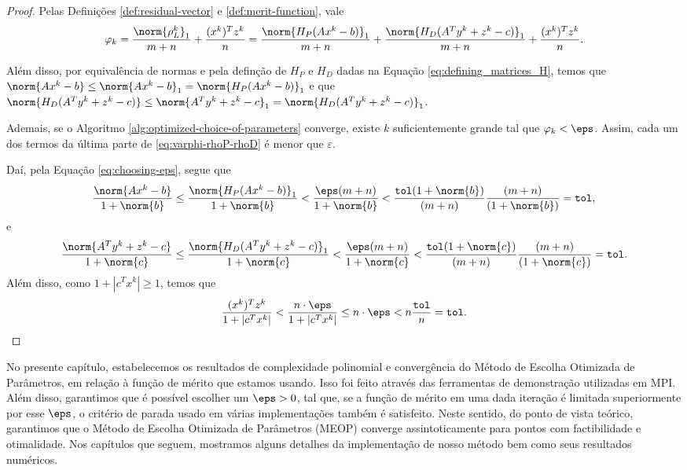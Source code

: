 \begin{proof}
	 Pelas Definições \ref{def:residual-vector} e \ref{def:merit-function}, vale
	\begin{equation}
		\label{eq:varphi-rhoP-rhoD}
				\varphi_{k} =  \frac{\norm{\rho^{k}_L}_1}{m+n} + 
\frac{(x^{k})^Tz^{k}}{n}  = \frac{\norm{H_{P}(Ax^{k} - b)}_1}{m+n} +\frac{\norm{H_{D}(A^{T}y^{k} + z^{k}- c)}_1 }{m+n} + 
\frac{(x^{k})^Tz^{k}}{n}.
	\end{equation}

Além disso, por equivalência de normas e pela definção de $H_{P}$ e $H_{D}$ dadas na Equação \eqref{eq:defining_matrices_H}, temos que $\norm{Ax^{k} - b} \leq \norm{Ax^{k} - b}_{1} = \norm{H_{P}(Ax^{k} - b)}_{1}$ e que $\norm{H_{D}(A^{T}y^{k} + z^{k}- c)} \leq \norm{A^{T}y^{k} + z^{k}- c}_1 = \norm{H_{D}(A^{T}y^{k} + z^{k}- c)}_1$.

Ademais, se  o Algoritmo \ref{alg:optimized-choice-of-parameters} converge, existe $k$ suficientemente grande tal que $\varphi_{k}<\eps$. Assim, cada um dos termos da última parte de \eqref{eq:varphi-rhoP-rhoD} é menor que $\varepsilon$.


Daí, pela Equação \eqref{eq:choosing-eps}, segue que 
\[
\dfrac{\norm{Ax^{k} - b}}{1 + \norm{b}} \leq  \frac{\norm{H_{P}(Ax^{k} - b)}_1  }{1 + \norm{b}} < \frac{\eps (m+n)}{1 + \norm{b}} <\frac{\tol(1+\norm{b})}{(m+n)} \frac{(m+n)}{(1 + \norm{b})} = \tol,
\]
e
\[
\dfrac{\norm{A^{T}y^{k} + z^{k}- c}}{1 + \norm{c}} \leq  \frac{\norm{H_{D}(A^{T}y^{k} + z^{k}- c)}_{1}  }{1 + \norm{c}} < \frac{\eps (m+n)}{1 + \norm{c}} <\frac{\tol(1+\norm{c})}{(m+n)} \frac{(m+n)}{(1 + \norm{c})} = \tol.
\]
Além disso, como $1+ |c^{T}x^{k}| \geq 1$, temos que 
\[
\dfrac{(x^{k})^{T}z^{k}}{1+ |c^{T}x^{k}|} <   \frac{n\cdot  \eps}{1+ |c^{T}x^{k}|} \leq n \cdot \eps < n \frac{\tol}{n} = \tol. \qedhere
\]
 \end{proof}

No presente capítulo, estabelecemos os resultados de complexidade polinomial e convergência  do Método de Escolha Otimizada de Parâmetros, em relação à função de mérito que estamos usando. Isso foi feito através das ferramentas de demonstração utilizadas em \acl{MPI}. Além disso, garantimos que é possível escolher um $\eps>0$, tal que, se a função de mérito em uma dada iteração é limitada superiormente por esse $\eps$, o critério de parada  usado em várias implementações também é satisfeito. Neste sentido, do ponto de vista teórico,  garantimos que o Método de Escolha Otimizada de Parâmetros (MEOP) converge assintoticamente para pontos com factibilidade e otimalidade. Nos capítulos que seguem, mostramos alguns detalhes da implementação de nosso método bem como seus resultados numéricos.


